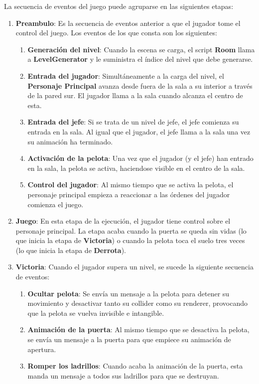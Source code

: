 La secuencia de eventos del juego puede agruparse en las siguientes etapas:
\begin{enumerate}
\item \textbf{Preambulo}: Es la secuencia de eventos anterior a que el jugador tome el control del juego. Los eventos de los que consta son los siguientes:
\begin{enumerate}
\item \textbf{Generación del nivel}: Cuando la escena se carga, el script \textbf{Room} llama a \textbf{LevelGenerator} y le suministra el índice del nivel que debe generarse.
\item \textbf{Entrada del jugador}: Simultáneamente a la carga del nivel, el \textbf{Personaje Principal} avanza desde fuera de la sala a su interior a través de la pared sur. El jugador llama a la sala cuando alcanza el centro de esta.
\item \textbf{Entrada del jefe}: Si se trata de un nivel de jefe, el jefe comienza su entrada en la sala. Al igual que el jugador, el jefe llama a la sala una vez su animación ha terminado.
\item \textbf{Activación de la pelota}: Una vez que el jugador (y el jefe) han entrado en la sala, la pelota se activa, haciendose visible en el centro de la sala. 
\item \textbf{Control del jugador}: Al mismo tiempo que se activa la pelota, el personaje principal empieza a reaccionar a las órdenes del jugador comienza el juego.
\end{enumerate}
\item \textbf{Juego}: En esta etapa de la ejecución, el jugador tiene control sobre el personaje principal. La etapa acaba cuando la puerta se queda sin vidas (lo que inicia la etapa de \textbf{Victoria}) o cuando la pelota toca el suelo tres veces (lo que inicia la etapa de \textbf{Derrota}).
\item \textbf{Victoria}: Cuando el jugador supera un nivel, se sucede la siguiente secuencia de eventos:
\begin{enumerate}
\item \textbf{Ocultar pelota}: Se envía un mensaje a la pelota para detener su movimiento y desactivar tanto su collider como su renderer, provocando que la pelota se vuelva invisible e intangible.
\item \textbf{Animación de la puerta}: Al mismo tiempo que se desactiva la pelota, se envía un mensaje a la puerta para que empiece su animación de apertura.
\item \textbf{Romper los ladrillos}: Cuando acaba la animación de la puerta, esta manda un mensaje a todos sus ladrillos para que se destruyan.

\end{enumerate}
\end{enumerate}
